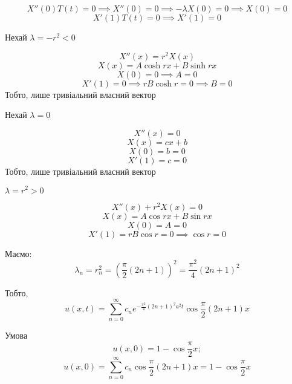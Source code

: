 \documentclass[11pt, a4paper]{article} %
\begin{document}
$$X''(0)T(t) = 0 \implies X''(0) = 0 \implies -\lambda X(0) = 0 \implies X(0) = 0$$
$$X'(1)T(t) = 0 \implies X'(1) = 0$$

\begin{mdframed}
    Нехай $\lambda = -r^2 < 0$
\end{mdframed}
$$X''(x) = r^2 X(x)$$
$$X(x) = A\cosh rx + B\sinh rx$$
$$X(0) = 0 \implies A = 0$$
$$X'(1) = 0 \implies rB\cosh r = 0 \implies B = 0$$
Тобто, лише тривіальний власний вектор

\begin{mdframed}
    Нехай $\lambda = 0$
\end{mdframed}
$$X''(x) = 0$$
$$X(x) = cx + b$$
$$X(0) = b = 0$$
$$X'(1) = c = 0$$
Тобто, лише тривіальний власний вектор


\begin{mdframed}
    $\lambda = r^2 > 0$
\end{mdframed}
$$X''(x) + r^2 X(x) = 0$$
$$X(x) = A\cos rx + B\sin rx$$
$$X(0) = A = 0$$
$$X'(1) = rB\cos r = 0 \implies \cos r = 0$$

Маємо:
$$\lambda_n = r_n^2 = \left(\frac{\pi}{2} (2n+1)\right)^2 = \frac{\pi^2}{4}(2n+1)^2$$

Тобто,
$$u(x,t) = \sum_{n=0}^\infty c_n e^{-\frac{\pi^2}{4}(2n+1)^2 a^2 t}\cos \frac{\pi}{2} (2n+1) x$$

Умова $$u(x,0) = 1 - \cos \frac{\pi}{2} x;$$
$$u(x,0) = \sum_{n=0}^\infty c_n \cos \frac{\pi}{2} (2n+1) x = 1 - \cos \frac{\pi}{2} x$$
\end{document}
